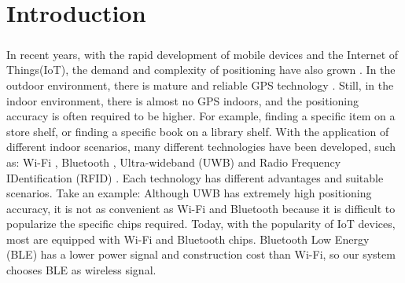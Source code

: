 \documentclass[a4paper,12pt]{report}
\begin{document}
\tableofcontents \newpage
{}
\listoffigures \newpage
{}
\listoftables \newpage
{}

\setcounter{page}{1}

\chapter{Introduction}
%

\paragraph{}
 In recent years, with the rapid development of mobile devices and the Internet of Things(IoT), the demand and complexity of positioning have also grown \cite{Zafari2019ASurvey, Gu2009ASurvey, Sadowski2018RSSI-Based}. In the outdoor environment, there is mature and reliable GPS technology \cite{Bulusu2000GPS-less, Aly2017Accurate}. Still, in the indoor environment, there is almost no GPS indoors, and the positioning accuracy is often required to be higher. For example, finding a specific item on a store shelf, or finding a specific book on a library shelf. With the application of different indoor scenarios, many different technologies have been developed, such as: Wi-Fi \cite{Xue2017Improved, Wang2017CiFi, Hashem2020WiNar}, Bluetooth \cite{Zhuang2016Smartphone-Based, Wang2015RSSI-Based, Luo2019Indoor}, Ultra-wideband (UWB) \cite{Dabove2018Indoor, Poulose2020UWB} and Radio Frequency IDentification (RFID) \cite{Huang2015Real-Time, Montaser2014RFID}. Each technology has different advantages and suitable scenarios. Take an example: Although UWB has extremely high positioning accuracy, it is not as convenient as Wi-Fi and Bluetooth because it is difficult to popularize the specific chips required. Today, with the popularity of IoT devices, most are equipped with Wi-Fi and Bluetooth chips. Bluetooth Low Energy (BLE) has a lower power signal and construction cost than Wi-Fi, so our system chooses BLE as wireless signal.
%

\end{document}
